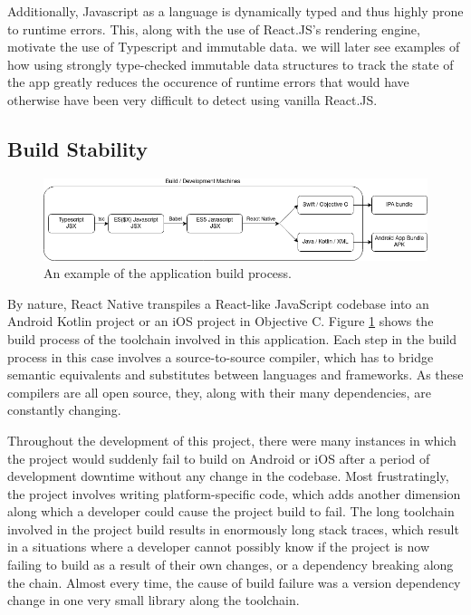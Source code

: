 Additionally, Javascript as a language is dynamically typed and thus highly prone to runtime errors. This, along with the use of React.JS's rendering engine, motivate the use of Typescript and immutable data. we will later see examples of how using strongly type-checked immutable data structures to track the state of the app greatly reduces the occurence of runtime errors that would have otherwise have been very difficult to detect using vanilla React.JS.

\subsection{Build Stability}

\begin{figure}[h]
    \begin{center}
        \includegraphics[scale=0.55]{images/app_build_path.png}
    \end{center}
    \caption{An example of the application build process.}
    \label{fig:app_build_process}
\end{figure}

By nature, React Native transpiles a React-like JavaScript codebase into an Android Kotlin project or an iOS project in Objective C. Figure \ref{fig:app_build_process} shows the build process of the toolchain involved in this application. Each step in the build process in this case involves a source-to-source compiler, which has to bridge semantic equivalents and substitutes between languages and frameworks. As these compilers are all open source, they, along with their many dependencies, are constantly changing.

Throughout the development of this project, there were many instances in which the project would suddenly fail to build on Android or iOS after a period of development downtime without any change in the codebase. Most frustratingly, the project involves writing platform-specific code, which adds another dimension along which a developer could cause the project build to fail. The long toolchain involved in the project build results in enormously long stack traces, which result in a situations where a developer cannot possibly know if the project is now failing to build as a result of their own changes, or a dependency breaking along the chain. Almost every time, the cause of build failure was a version dependency change in one very small library along the toolchain.

